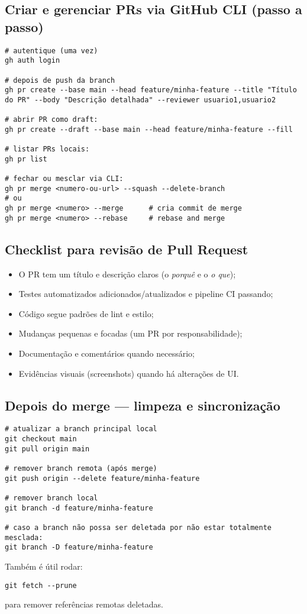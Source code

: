 \subsection{Criar e gerenciar PRs via GitHub CLI (passo a passo)}
\begin{verbatim}
# autentique (uma vez)
gh auth login

# depois de push da branch
gh pr create --base main --head feature/minha-feature --title "Título do PR" --body "Descrição detalhada" --reviewer usuario1,usuario2

# abrir PR como draft:
gh pr create --draft --base main --head feature/minha-feature --fill

# listar PRs locais:
gh pr list

# fechar ou mesclar via CLI:
gh pr merge <numero-ou-url> --squash --delete-branch
# ou
gh pr merge <numero> --merge      # cria commit de merge
gh pr merge <numero> --rebase     # rebase and merge
\end{verbatim}

\subsection{Checklist para revisão de Pull Request}
\begin{itemize}
  \item O PR tem um título e descrição claros (o \emph{porquê} e o \emph{o que});  
  \item Testes automatizados adicionados/atualizados e pipeline CI passando;  
  \item Código segue padrões de lint e estilo;  
  \item Mudanças pequenas e focadas (um PR por responsabilidade);  
  \item Documentação e comentários quando necessário;  
  \item Evidências visuais (screenshots) quando há alterações de UI.  
\end{itemize}

\subsection{Depois do merge — limpeza e sincronização}
\begin{verbatim}
# atualizar a branch principal local
git checkout main
git pull origin main

# remover branch remota (após merge)
git push origin --delete feature/minha-feature

# remover branch local
git branch -d feature/minha-feature

# caso a branch não possa ser deletada por não estar totalmente mesclada:
git branch -D feature/minha-feature
\end{verbatim}
Também é útil rodar:
\begin{verbatim}
git fetch --prune
\end{verbatim}
para remover referências remotas deletadas.

